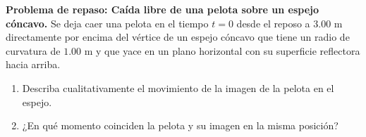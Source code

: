 \item \textbf{Problema de repaso: Caída libre de una pelota sobre un espejo cóncavo.}
Se deja caer una pelota en el tiempo $t = 0$ desde el reposo a $3.00\text{ m}$ directamente por encima del vértice de un espejo cóncavo que tiene un radio de curvatura de $1.00\text{ m}$ y que yace en un plano horizontal con su superficie reflectora hacia arriba.
\begin{enumerate}
    \item Describa cualitativamente el movimiento de la imagen de la pelota en el espejo.
    \item ¿En qué momento coinciden la pelota y su imagen en la misma posición?
\end{enumerate}
